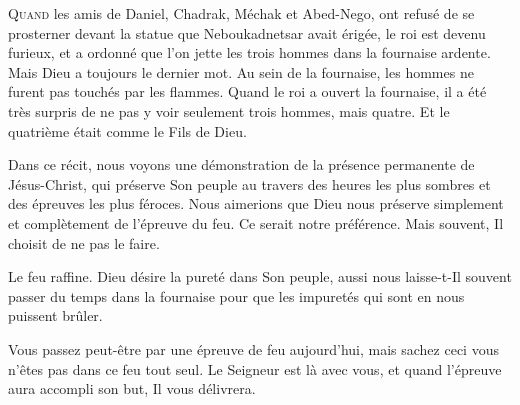 


\lettrine{Q}{uand} les amis de Daniel, Chadrak, Méchak et Abed-Nego,
 ont refusé de se prosterner devant la statue que Neboukadnetsar avait érigée,
 le roi est devenu furieux, et a ordonné que l'on jette les trois hommes
 dans la fournaise ardente. Mais Dieu a toujours le dernier mot.
 Au sein de la fournaise, les hommes ne furent pas touchés par les flammes.
 Quand le roi a ouvert la fournaise, il a été très surpris de ne pas y voir
 seulement trois hommes, mais quatre.
 Et le quatrième était comme \Og le Fils de Dieu. \Fg{}

Dans ce récit, nous voyons une démonstration de la présence permanente
 de Jésus-Christ, qui préserve Son peuple au travers des heures
 les plus sombres et des  épreuves les plus féroces.
 Nous aimerions que Dieu nous préserve simplement et complètement
 de l'épreuve du feu. Ce serait notre préférence.
 Mais souvent, Il choisit de ne pas le faire. 


Le feu raffine. Dieu désire la pureté dans Son peuple,
 aussi nous laisse-t-Il souvent passer du temps dans la fournaise
 pour que les impuretés qui sont en nous puissent brûler. 

Vous passez peut-être par une épreuve de feu aujourd'hui, mais sachez ceci
 \ocadr vous n'êtes pas dans ce feu tout seul.
 Le Seigneur est là avec vous, et quand l'épreuve aura accompli son but,
 Il vous délivrera. 

\dvrule



